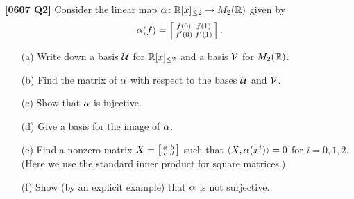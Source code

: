\documentclass[a4paper]{article}
\begin{document}
\begin{problem}\textbf{[0607 Q2]}
 Consider the linear map $\alpha\colon{\mathbb{R}}[x]_{\leq 2}\to M_2({\mathbb{R}})$ given by 
 \[ \alpha(f) = \left[\begin{smallmatrix} f(0) & f(1) \\ f'(0) & f'(1) \end{smallmatrix}\right]. \]
 \begin{itemize}
  \item[(a)] Write down a basis $\mathcal{U}$ for ${\mathbb{R}}[x]_{\leq 2}$ and a basis
   $\mathcal{V}$ for $M_2({\mathbb{R}})$. 
  \item[(b)] Find the matrix of $\alpha$ with respect to the bases $\mathcal{U}$
   and $\mathcal{V}$. 
  \item[(c)] Show that $\alpha$ is injective. 
  \item[(d)] Give a basis for the image of $\alpha$. 
  \item[(e)] Find a nonzero matrix $X=\left[\begin{smallmatrix} a&b\\ c&d\end{smallmatrix}\right]$ such that
   $\langle X,\alpha(x^i)\rangle=0$ for $i=0,1,2$. \\
   (Here we use the standard inner product for square matrices.)
  \item[(f)] Show (by an explicit example) that $\alpha$ is not
   surjective. 
 \end{itemize}
\end{problem}
\end{document}
